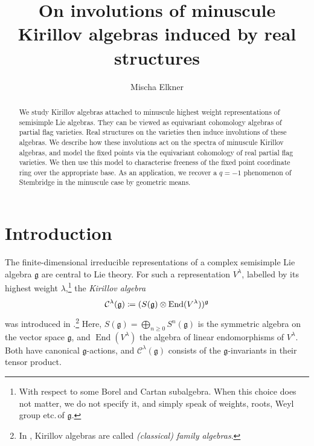 \documentclass{amsart}
\title{On involutions of minuscule Kirillov algebras induced by real structures}
\author{Mischa Elkner}
\date{}
\newcommand{\Kir}{\mathcal{C}}
\newcommand{\End}{\operatorname{End}}
\newcommand{\g}{\mathfrak{g}}
\theoremstyle{definition}
\theoremstyle{plain}
\theoremstyle{remark}
\begin{document}
\begin{abstract}
    We study Kirillov algebras attached to minuscule highest weight representations of semisimple Lie algebras. They can be viewed as equivariant cohomology algebras of partial flag varieties. Real structures on the varieties then induce involutions of these algebras. We describe how these involutions act on the spectra of minuscule Kirillov algebras, and model the fixed points via the equivariant cohomology of real partial flag varieties. We then use this model to characterise freeness of the fixed point coordinate ring over the appropriate base. As an application, we recover a $q=-1$ phenomenon of Stembridge in the minuscule case by geometric means.
\end{abstract}

\maketitle

\tableofcontents

\section{Introduction}
The finite-dimensional irreducible representations of a complex semisimple Lie algebra $\g$ are central to Lie theory. For such a representation $V^\lambda$, labelled by its highest weight $\lambda$,\footnote{With respect to some Borel and Cartan subalgebra. When this choice does not matter, we do not specify it, and simply speak of weights, roots, Weyl group etc.\,of $\g$.} the \emph{Kirillov algebra}
$$
    \Kir^\lambda(\g)
    \coloneqq
    (S(\g) \otimes \End(V^\lambda))^\g
    \vspace{3pt}
$$
was introduced in \cite{Kirillov2001_introduction}.\footnote{In \cite{Kirillov2001_introduction}, Kirillov algebras are called \emph{(classical) family algebras}.} Here, $S(\g) = \bigoplus_{n\ge 0}S^n(\g)$ is the symmetric algebra on the vector space $\g$, and $\End(V^\lambda)$ the algebra of linear endomorphisms of $V^\lambda$. Both have canonical $\g$-actions, and $\Kir^\lambda(\g)$ consists of the $\g$-invariants in their tensor product.
\end{document}
